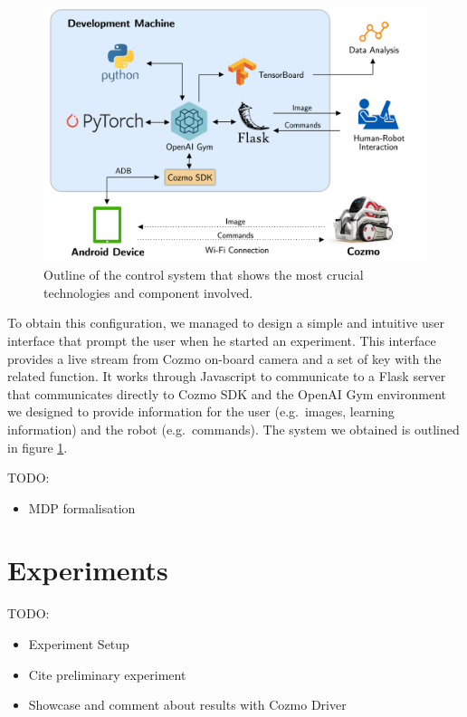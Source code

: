 \documentclass[10pt,twocolumn,letterpaper]{article}
\begin{document}
\begin{figure}[tbp]
    \centering
    \includegraphics[width=0.97\columnwidth]{cozmo-system.png}
    \caption[Outline of the control system]{Outline of the control system that shows the most crucial technologies and component involved.}
    \label{system}
\end{figure}

To obtain this configuration, we managed to design a simple and intuitive user interface that prompt the user when he started an experiment. This interface provides a live stream from Cozmo on-board camera and a set of key with the related function. It works through Javascript to communicate to a Flask server that communicates directly to Cozmo SDK and the OpenAI Gym environment we designed to provide information for the user (e.g.\ images, learning information) and the robot (e.g.\ commands). The system we obtained is outlined in figure \ref{system}.

TODO:
\begin{itemize}
    \item MDP formalisation
\end{itemize}

\section{Experiments}

TODO:
\begin{itemize}
    \item Experiment Setup
    \item Cite preliminary experiment
    \item Showcase and comment about results with Cozmo Driver
\end{itemize}
\end{document}
